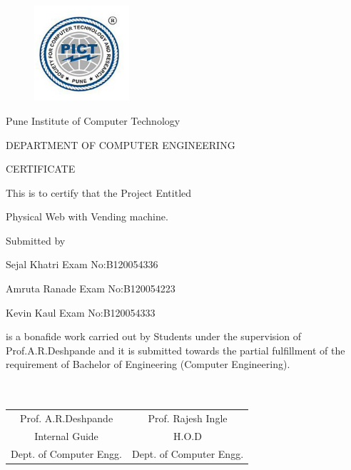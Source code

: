 \documentclass[oneside,a4paper,12pt]{report}
\begin{document}
\newpage



\begin{figure}[ht]
\centering
\includegraphics[width=100pt]{collegelogo.png}
\end{figure}


{\bfseries \fontsize{14}{12} \selectfont \centerline{Pune Institute of Computer Technology}
\centerline{DEPARTMENT OF COMPUTER ENGINEERING}
\vspace*{3\baselineskip}} 


{\bfseries \fontsize{16}{12} \selectfont \centerline{CERTIFICATE} 
\vspace*{3\baselineskip}} 

\centerline{This is to certify that the Project Entitled}
\vspace*{1\baselineskip} 


{\bfseries \fontsize{14}{12} \selectfont \centerline{ Physical Web with Vending machine.}
\vspace*{1\baselineskip}}

\centerline{Submitted by}
\vspace*{1\baselineskip} 
\centerline{Sejal Khatri  \hspace{25 mm} Exam No:B120054336} 
\centerline{Amruta Ranade \hspace{25 mm} Exam No:B120054223  } 
\centerline{Kevin Kaul \hspace{25 mm} Exam No:B120054333 }
\vspace*{1\baselineskip} 
is a bonafide work carried out by Students under the supervision of Prof.A.R.Deshpande and it
is submitted towards the partial fulfillment of the requirement of Bachelor of Engineering (Computer Engineering).\\\\\\

\bgroup
\def\arraystretch{0.7}
\begin{tabular}{c c }
Prof. A.R.Deshpande &  \hspace{50 mm} Prof. Rajesh Ingle \\								
Internal Guide   &  \hspace{50 mm} H.O.D \\
Dept. of Computer Engg.  &	\hspace{50 mm}Dept. of Computer Engg.  \\
\end{tabular}
\end{document}
